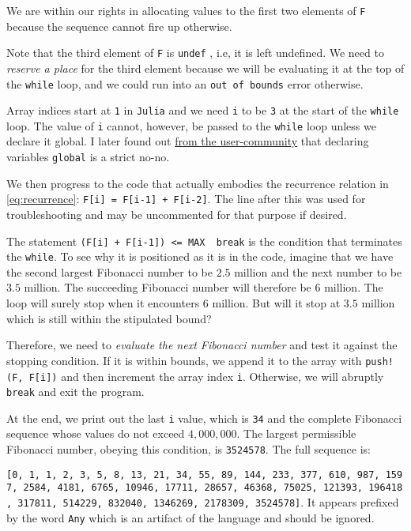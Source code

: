 \documentclass[
  a4paper,
]{article}
\begin{document}
We are within our rights in allocating values to the first two elements
of \texttt{F} because the sequence cannot fire up otherwise.

Note that the third element of \texttt{F} is \texttt{undef} , i.e, it is
left undefined. We need to \emph{reserve a place} for the third element
because we will be evaluating it at the top of the \texttt{while} loop,
and we could run into an \texttt{out\ of\ bounds} error otherwise.

Array indices start at \texttt{1} in \texttt{Julia} and we need
\texttt{i} to be \texttt{3} at the start of the \texttt{while} loop. The
value of \texttt{i} cannot, however, be passed to the \texttt{while}
loop unless we declare it global. I later found out
\href{https://discourse.julialang.org/t/help-with-project-euler-2-undef-inits-printing-multiplication-by-juxtaposition-and-more/106930}{from
the user-community} that declaring variables \texttt{global} is a strict
no-no.

We then progress to the code that actually embodies the recurrence
relation in \cref{eq:recurrence}:
\texttt{F{[}i{]}\ =\ F{[}i-1{]}\ +\ F{[}i-2{]}}. The line after this was
used for troubleshooting and may be uncommented for that purpose if
desired.

The statement
\texttt{(F{[}i{]}\ +\ F{[}i-1{]})\ \textless{}=\ MAX\ \textbar{}\textbar{}\ break}
is the condition that terminates the \texttt{while}. To see why it is
positioned as it is in the code, imagine that we have the second largest
Fibonacci number to be \(2.5\) million and the next number to be \(3.5\)
million. The succeeding Fibonacci number will therefore be \(6\)
million. The loop will surely stop when it encounters \(6\) million. But
will it stop at \(3.5\) million which is still within the stipulated
bound?

Therefore, we need to \emph{evaluate the next Fibonacci number} and test
it against the stopping condition. If it is within bounds, we append it
to the array with \texttt{push!(F,\ F{[}i{]})} and then increment the
array index \texttt{i}. Otherwise, we will abruptly \texttt{break} and
exit the program.

At the end, we print out the last \texttt{i} value, which is \texttt{34}
and the complete Fibonacci sequence whose values do not exceed
\(4,000,000\). The largest permissible Fibonacci number, obeying this
condition, is \texttt{3524578}. The full sequence is:

\texttt{{[}0,\ 1,\ 1,\ 2,\ 3,\ 5,\ 8,\ 13,\ 21,\ 34,\ 55,\ 89,\ 144,\ 233,\ 377,\ 610,\ 987,\ 1597,\ 2584,\ 4181,\ 6765,\ 10946,\ 17711,\ 28657,\ 46368,\ 75025,\ 121393,\ 196418,\ 317811,\ 514229,\ 832040,\ 1346269,\ 2178309,\ 3524578{]}}.
It appears prefixed by the word \texttt{Any} which is an artifact of the
language and should be ignored.
\end{document}
